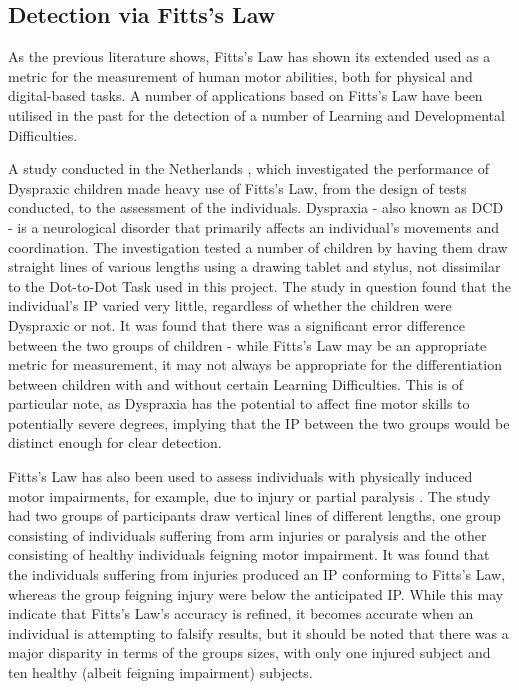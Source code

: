 		
	\subsection{Detection via Fitts’s Law}
		As the previous literature shows, Fitts’s Law has shown its extended used as a metric for the measurement of human motor abilities, both for physical and digital-based tasks. A number of applications based on Fitts’s Law have been utilised in the past for the detection of a number of Learning  and Developmental Difficulties.
		
		A study conducted in the Netherlands \cite{Smits-Engelsman2003}, which investigated the performance of Dyspraxic children made heavy use of Fitts’s Law, from the design of tests conducted, to the assessment of the individuals. Dyspraxia - also known as DCD - is a neurological disorder that primarily affects an individual’s movements and coordination. The investigation tested a number of children by having them draw straight lines of various lengths using a drawing tablet and stylus, not dissimilar to the Dot-to-Dot Task used in this project. The study in question found that the individual's IP varied very little, regardless of whether the children were Dyspraxic or not. It was found that there was a significant error difference between the two groups of children - while Fitts’s Law may be an appropriate metric for measurement, it may not always be appropriate for the differentiation between children with and without certain Learning Difficulties. This is of particular note, as Dyspraxia has the potential to affect fine motor skills to potentially severe degrees, implying that the IP between the two groups would be distinct enough for clear detection.
		
		
		Fitts’s Law has also been used to assess individuals with physically induced motor impairments, for example, due to injury or partial paralysis \cite{Maruff2000}. The study had two groups of participants draw vertical lines of different lengths, one group consisting of individuals suffering from arm injuries or paralysis and the other consisting of healthy individuals feigning motor impairment. It was found that the individuals suffering from injuries produced an IP conforming to Fitts’s Law, whereas the group feigning injury were below the anticipated IP. While this may indicate that Fitts’s Law’s accuracy is refined, it becomes accurate when an individual is attempting to falsify results, but it should be noted that there was a major disparity in terms of the groups sizes, with only one injured subject and ten healthy (albeit feigning impairment) subjects.
		
